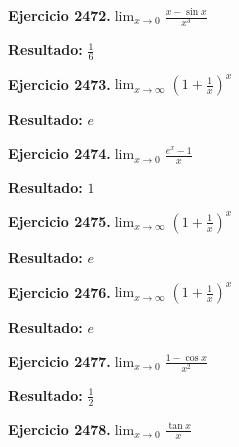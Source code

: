 \documentclass[10pt,a4paper]{article}
\begin{document}
\newpage
\begin{ejbox}
\textbf{Ejercicio 2472.}\quad $\lim_{x\to 0} \frac{x-\sin x}{x^3}$
\end{ejbox}

\begin{solbox}
\textbf{Resultado:} \(\displaystyle \frac{1}{6}\)
\end{solbox}

\begin{ejbox}
\textbf{Ejercicio 2473.}\quad $\lim_{x\to \infty} \left(1+\frac{1}{x}\right)^x$
\end{ejbox}

\begin{solbox}
\textbf{Resultado:} \(\displaystyle e\)
\end{solbox}

\begin{ejbox}
\textbf{Ejercicio 2474.}\quad $\lim_{x\to 0} \frac{e^x-1}{x}$
\end{ejbox}

\begin{solbox}
\textbf{Resultado:} \(\displaystyle 1\)
\end{solbox}

\newpage
\begin{ejbox}
\textbf{Ejercicio 2475.}\quad $\lim_{x\to \infty} \left(1+\frac{1}{x}\right)^x$
\end{ejbox}

\begin{solbox}
\textbf{Resultado:} \(\displaystyle e\)
\end{solbox}

\begin{ejbox}
\textbf{Ejercicio 2476.}\quad $\lim_{x\to \infty} \left(1+\frac{1}{x}\right)^x$
\end{ejbox}

\begin{solbox}
\textbf{Resultado:} \(\displaystyle e\)
\end{solbox}

\begin{ejbox}
\textbf{Ejercicio 2477.}\quad $\lim_{x\to 0} \frac{1-\cos x}{x^2}$
\end{ejbox}

\begin{solbox}
\textbf{Resultado:} \(\displaystyle \frac{1}{2}\)
\end{solbox}

\newpage
\begin{ejbox}
\textbf{Ejercicio 2478.}\quad $\lim_{x\to 0} \frac{\tan x}{x}$
\end{ejbox}
\end{document}
